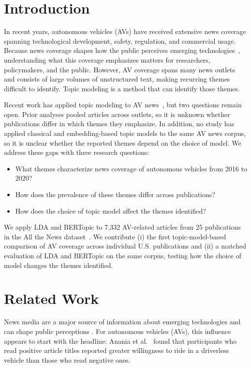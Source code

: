 \documentclass[conference]{IEEEtran}
\begin{document}
\section*{Introduction}
In recent years, autonomous vehicles (AVs) have received extensive news coverage spanning technological development, safety, regulation, and commercial usage. Because news coverage shapes how the public perceives emerging technologies~\cite{christen2007media, anania2018effects}, understanding what this coverage emphasizes matters for researchers, policymakers, and the public. However, AV coverage spans many news outlets and consists of large volumes of unstructured text, making recurring themes difficult to identify. Topic modeling is a method that can identify those themes. 

Recent work has applied topic modeling to AV news~\cite{kang2025unveiling}, but two questions remain open. Prior analyses pooled articles across outlets, so it
is unknown whether publications differ in which themes they emphasize. In addition, no study has applied classical and embedding-based topic models to the same AV news corpus, so it is unclear whether the reported themes depend on the
choice of model. We address these gaps with three research questions:

\begin{itemize}
    \item What themes characterize news coverage of autonomous vehicles from 2016 to 2020?
    \item How does the prevalence of these themes differ across publications?
    \item How does the choice of topic model affect the themes identified?
\end{itemize}

We apply LDA and BERTopic to 7,332 AV-related articles from 25 publications in the All the News dataset~\cite{mckinley2021}. We contribute (i) the first topic-model-based comparison of AV coverage across individual U.S. publications and (ii) a matched evaluation of LDA and BERTopic on the same corpus, testing how the choice of model changes the themes identified.


\section*{Related Work}
News media are a major source of information about emerging technologies and can shape public perceptions \cite{christen2007media}. For autonomous vehicles (AVs), this influence appears to start with the headline: Anania et al.~\cite{anania2018effects} found that participants who read positive article titles reported greater willingness to ride in a driverless vehicle than those who read negative ones.
\end{document}
